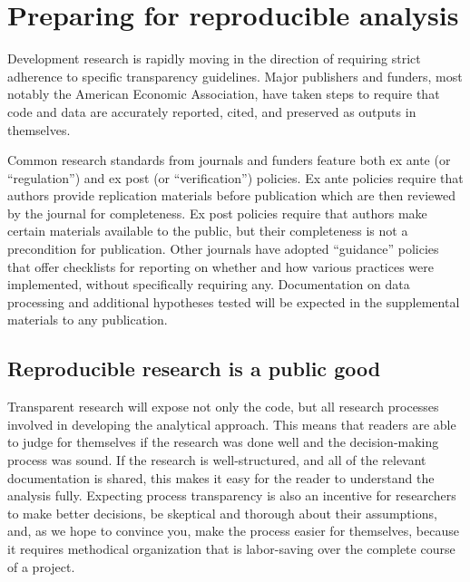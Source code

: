 \section{Preparing for reproducible analysis}


Development research is rapidly moving in the direction of requiring strict adherence
to specific transparency guidelines.\cite{christensen2018transparency}
Major publishers and funders, most notably the American Economic Association,
have taken steps to require that code and data
are accurately reported, cited, and preserved as outputs in themselves.

Common research standards from journals and funders feature both ex ante
(or ``regulation'') and ex post (or ``verification'') policies.\cite{stodden2013toward}
Ex ante policies require that authors
provide replication materials before publication
which are then reviewed by the journal for completeness.
Ex post policies require that authors make certain materials available to the public,
but their completeness is not a precondition for publication.
Other journals have adopted ``guidance'' policies that offer checklists
for reporting on whether and how various practices were implemented,
without specifically requiring any.\cite{nosek2015promoting}
Documentation on data processing and additional hypotheses tested
will be expected in the supplemental materials to any publication.

\subsection{Reproducible research is a public good}
Transparent research will expose not only the code,
but all research processes involved in developing the analytical approach.
This means that readers are able to judge for themselves if the research was done well
and the decision-making process was sound.
If the research is well-structured, and all of the relevant documentation
is shared, this makes it easy for the reader to understand the analysis fully.
Expecting process transparency is also an incentive for researchers to make better decisions,
be skeptical and thorough about their assumptions,
and, as we hope to convince you, make the process easier for themselves,
because it requires methodical organization that is labor-saving over the complete course of a project.

